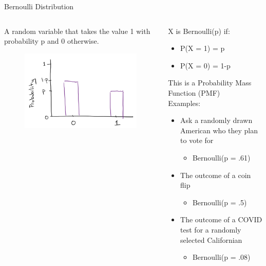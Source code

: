 \documentclass[aspectratio=169]{../latex_main/tntbeamer}  %
\begin{document}
	
	\begin{frame}[c]{Bernoulli Distribution}
	    \begin{columns}
	        \begin{column}{.3\textwidth}
	             A random variable that takes the value 1 with probability p and 0 otherwise.\\
	            \begin{figure}
	                \centering
	                \includegraphics[scale=.6]{Bild17}
	            \end{figure}
	        \end{column}
	        
	        
	        \begin{column}{.5\textwidth}
	          X is Bernoulli(p) if:\\
	          \begin{itemize}
	              \item P(X = 1) = p
	              \item P(X = 0) = 1-p
	          \end{itemize}
              This is a Probability Mass Function (PMF)\\
              Examples:
              \begin{itemize}
                  \item Ask a randomly drawn American who they plan to vote for
                  \begin{itemize}
                      \item Bernoulli(p = .61)
                  \end{itemize}
                  \item The outcome of a coin flip
                  \begin{itemize}
                      \item Bernoulli(p = .5)
                  \end{itemize}
                  \item The outcome of a COVID test for a randomly selected Californian
                  \begin{itemize}
                      \item Bernoulli(p = .08)
                  \end{itemize}
              \end{itemize}
                

\end{column}
\end{columns}
\end{frame}
\end{document}
